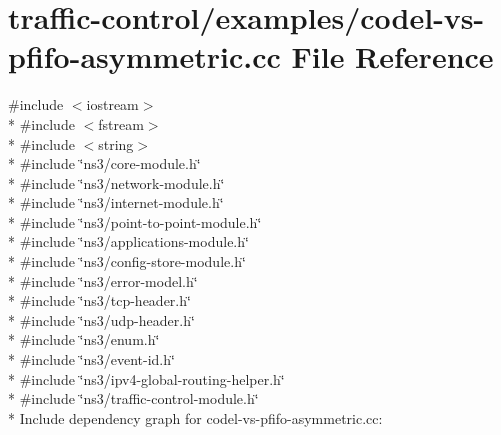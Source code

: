 \hypertarget{codel-vs-pfifo-asymmetric_8cc}{}\section{traffic-\/control/examples/codel-\/vs-\/pfifo-\/asymmetric.cc File Reference}
\label{codel-vs-pfifo-asymmetric_8cc}
{\ttfamily \#include $<$iostream$>$}\\*
{\ttfamily \#include $<$fstream$>$}\\*
{\ttfamily \#include $<$string$>$}\\*
{\ttfamily \#include \char`\"{}ns3/core-\/module.\+h\char`\"{}}\\*
{\ttfamily \#include \char`\"{}ns3/network-\/module.\+h\char`\"{}}\\*
{\ttfamily \#include \char`\"{}ns3/internet-\/module.\+h\char`\"{}}\\*
{\ttfamily \#include \char`\"{}ns3/point-\/to-\/point-\/module.\+h\char`\"{}}\\*
{\ttfamily \#include \char`\"{}ns3/applications-\/module.\+h\char`\"{}}\\*
{\ttfamily \#include \char`\"{}ns3/config-\/store-\/module.\+h\char`\"{}}\\*
{\ttfamily \#include \char`\"{}ns3/error-\/model.\+h\char`\"{}}\\*
{\ttfamily \#include \char`\"{}ns3/tcp-\/header.\+h\char`\"{}}\\*
{\ttfamily \#include \char`\"{}ns3/udp-\/header.\+h\char`\"{}}\\*
{\ttfamily \#include \char`\"{}ns3/enum.\+h\char`\"{}}\\*
{\ttfamily \#include \char`\"{}ns3/event-\/id.\+h\char`\"{}}\\*
{\ttfamily \#include \char`\"{}ns3/ipv4-\/global-\/routing-\/helper.\+h\char`\"{}}\\*
{\ttfamily \#include \char`\"{}ns3/traffic-\/control-\/module.\+h\char`\"{}}\\*
Include dependency graph for codel-\/vs-\/pfifo-\/asymmetric.cc\+:
